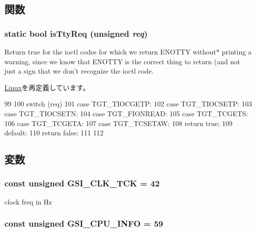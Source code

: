\subsection{関数}
\hypertarget{classMipsLinux_ab20bdd4422ecf6e1736a5587be296b3f}{
\subsubsection[{isTtyReq}]{\setlength{\rightskip}{0pt plus 5cm}static bool isTtyReq (unsigned {\em req})}}
\label{classMipsLinux_ab20bdd4422ecf6e1736a5587be296b3f}
Return true for the ioctl codes for which we return ENOTTY without$\ast$ printing a warning, since we know that ENOTTY is the correct thing to return (and not just a sign that we don't recognize the ioctl code. 

\hyperlink{classLinux_ab20bdd4422ecf6e1736a5587be296b3f}{Linux}を再定義しています。


\begin{DoxyCode}
99     {
100         switch (req) {
101           case TGT_TIOCGETP:
102           case TGT_TIOCSETP:
103           case TGT_TIOCSETN:
104           case TGT_FIONREAD:
105           case TGT_TCGETS:
106           case TGT_TCGETA:
107           case TGT_TCSETAW:
108             return true;
109           default:
110             return false;
111         }
112     }
\end{DoxyCode}


\subsection{変数}
\hypertarget{classMipsLinux_a26c255cf18ca324c7c09a629e9e2a4f0}{
\subsubsection[{GSI\_\-CLK\_\-TCK}]{\setlength{\rightskip}{0pt plus 5cm}const unsigned {\bf GSI\_\-CLK\_\-TCK} = 42}}
\label{classMipsLinux_a26c255cf18ca324c7c09a629e9e2a4f0}


clock freq in Hz \hypertarget{classMipsLinux_ad89f91e0925845385f177d93e4ef7985}{
\subsubsection[{GSI\_\-CPU\_\-INFO}]{\setlength{\rightskip}{0pt plus 5cm}const unsigned {\bf GSI\_\-CPU\_\-INFO} = 59}}
\label{classMipsLinux_ad89f91e0925845385f177d93e4ef7985}


